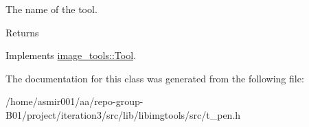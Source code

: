 The name of the tool. 

\begin{DoxyReturn}{Returns}

\end{DoxyReturn}


Implements \hyperlink{classimage__tools_1_1Tool_a251c179e3ac9756d08fbcd082750f8a9}{image\+\_\+tools\+::\+Tool}.



The documentation for this class was generated from the following file\+:\begin{DoxyCompactItemize}
\item 
/home/asmir001/aa/repo-\/group-\/\+B01/project/iteration3/src/lib/libimgtools/src/t\+\_\+pen.\+h\end{DoxyCompactItemize}
